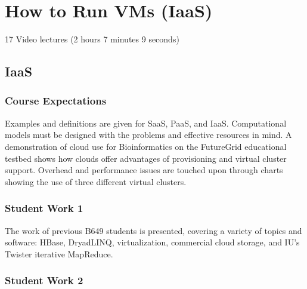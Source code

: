 \part{How to Run VMs (IaaS)}
\label{sec:icloud-iaas}

  17 Video lectures (2 hours 7 minutes 9 seconds)

\chapter{IaaS}

\section{Course Expectations}

Examples and definitions are given for SaaS, PaaS, and IaaS.
Computational models must be designed with the problems and effective
resources in mind. A demonstration of cloud use for Bioinformatics on
the FutureGrid educational testbed shows how clouds offer advantages of
provisioning and virtual cluster support. Overhead and performance
issues are touched upon through charts showing the use of three
different virtual clusters.



\section{Student Work 1}

The work of previous B649 students is presented, covering a variety of
topics and software: HBase, DryadLINQ, virtualization, commercial cloud
storage, and IU's Twister iterative MapReduce.



\section{Student Work 2}

